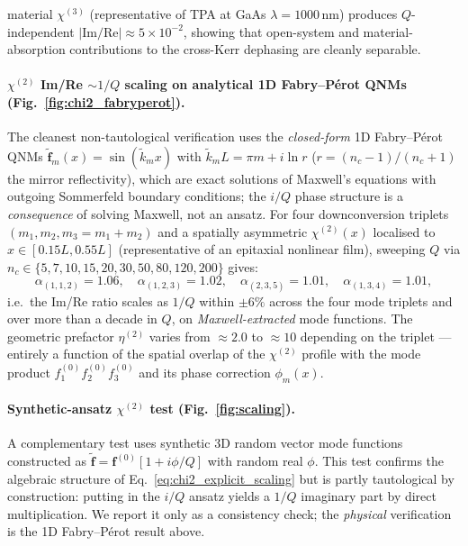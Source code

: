 \documentclass[12pt]{article}
\newcommand{\tf}{\tilde{\mathbf{f}}}
\begin{document}
material $\chi^{(3)}$ (representative of TPA at GaAs
$\lambda=1000\,\mathrm{nm}$) produces $Q$-independent
$|\mathrm{Im}/\mathrm{Re}|\approx 5\times 10^{-2}$, showing that
open-system and material-absorption contributions to the cross-Kerr
dephasing are cleanly separable.

\paragraph{$\chi^{(2)}$ Im/Re $\sim 1/Q$ scaling on analytical 1D
Fabry--P\'erot QNMs (Fig.~\ref{fig:chi2_fabryperot}).}
The cleanest non-tautological verification uses the
\emph{closed-form} 1D Fabry--P\'erot QNMs
$\tf_m(x)=\sin(\tilde{k}_m x)$ with $\tilde{k}_m L = \pi m + i\ln r$
($r=(n_c-1)/(n_c+1)$ the mirror reflectivity), which are exact
solutions of Maxwell's equations with outgoing Sommerfeld boundary
conditions; the $i/Q$ phase structure is a \emph{consequence} of
solving Maxwell, not an ansatz.  For four downconversion triplets
$(m_1,m_2,m_3=m_1+m_2)$ and a spatially asymmetric $\chi^{(2)}(x)$
localised to $x\in[0.15L,0.55L]$ (representative of an epitaxial
nonlinear film), sweeping $Q$ via $n_c\in\{5,7,10,15,20,30,50,80,
120,200\}$ gives:
\begin{equation}
  \alpha_{(1,1,2)}=1.06,\quad
  \alpha_{(1,2,3)}=1.02,\quad
  \alpha_{(2,3,5)}=1.01,\quad
  \alpha_{(1,3,4)}=1.01,
\end{equation}
i.e.\ the Im/Re ratio scales as $1/Q$ within $\pm 6\%$ across the
four mode triplets and over more than a decade in $Q$, on
\emph{Maxwell-extracted} mode functions.  The geometric prefactor
$\eta^{(2)}$ varies from $\approx 2.0$ to $\approx 10$ depending on
the triplet --- entirely a function of the spatial overlap of the
$\chi^{(2)}$ profile with the mode product $f^{(0)}_1 f^{(0)}_2
f^{(0)}_3$ and its phase correction $\phi_m(x)$.

\paragraph{Synthetic-ansatz $\chi^{(2)}$ test (Fig.~\ref{fig:scaling}).}
A complementary test uses synthetic 3D random vector mode functions
constructed as $\tf=\mathbf{f}^{(0)}[1+i\phi/Q]$ with random real
$\phi$.  This test confirms the algebraic structure of
Eq.~\eqref{eq:chi2_explicit_scaling} but is partly tautological by
construction: putting in the $i/Q$ ansatz yields a $1/Q$ imaginary
part by direct multiplication.  We report it only as a consistency
check; the \emph{physical} verification is the 1D Fabry--P\'erot
result above.
\end{document}
